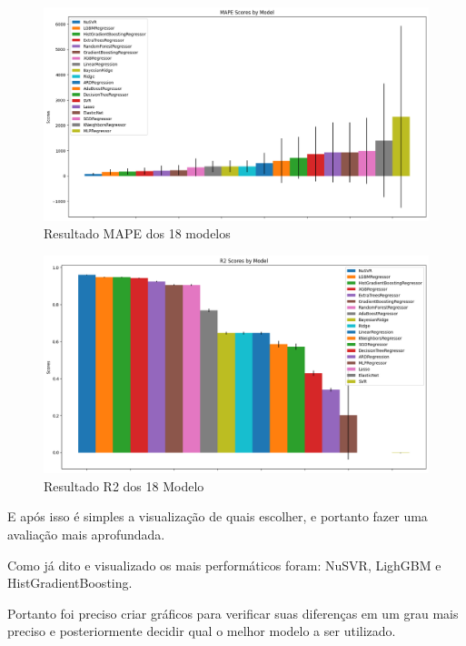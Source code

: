 \documentclass[journal]{IEEEtran}
\begin{document}
\begin{figure}[H]
    \centering
    \includegraphics[width=1\linewidth]{image4.png}
    \caption{Resultado MAPE dos 18 modelos}
    \label{fig:MAPE18}
\end{figure}

\begin{figure}[H]
    \centering
    \includegraphics[width=1\linewidth]{image2.png}
    \caption{Resultado R2 dos 18 Modelo}
    \label{fig:R218}
\end{figure}



E após isso é simples a visualização de quais escolher, e portanto fazer uma avaliação mais aprofundada.

Como já dito e visualizado os mais performáticos foram: NuSVR, LighGBM e HistGradientBoosting.

Portanto foi preciso criar gráficos para verificar suas diferenças em um grau mais preciso e posteriormente decidir qual o melhor modelo a ser utilizado.
\end{document}

